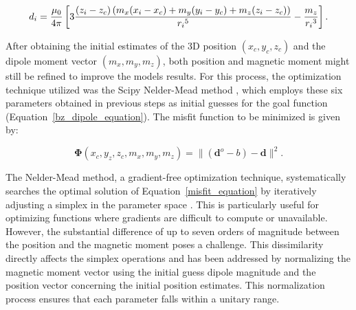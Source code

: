 
    \begin{equation}
        \small
        \label{bz_dipole_equation}
        {d}_{i} = \frac{\mu_0}{4 \pi} \left [ 3 \frac{ (z_i-z_c) \left ( m_x (x_i-x_c) + m_y (y_i-y_c) + m_z (z_i-z_c) \right )}{{r_i}^5} - \frac{m_z}{{r_i}^3} \right ] .
    \end{equation}
    
     After obtaining the initial estimates of the 3D position $(x_c, y_c, z_c)$ and the dipole moment vector $(m_x, m_y, m_z)$, both position and magnetic moment might still be refined to improve the models results. For this process, the optimization technique utilized was the Scipy Nelder-Mead method \citep{2020SciPy-NMeth}, which employs these six parameters obtained in previous steps as initial guesses for the goal function (Equation~\ref{bz_dipole_equation}). The misfit function to be minimized is given by:
    
    \begin{equation}
    \label{misfit_equation}
    \mathbf{\Phi} (x_c, y_z, z_c, m_x, m_y, m_z) = \| (\mathbf{d}^{o}-b) - \mathbf{d} \|^2.
    \end{equation} 
    
     The Nelder-Mead method, a gradient-free optimization technique, systematically searches the optimal solution of Equation~\ref{misfit_equation} by iteratively adjusting a simplex in the parameter space \citep{Nelder-Mead1965}. This is particularly useful for optimizing functions where gradients are difficult to compute or unavailable. However, the substantial difference of up to seven orders of magnitude between the position and the magnetic moment poses a challenge. This dissimilarity directly affects the simplex operations and has been addressed by normalizing the magnetic moment vector using the initial guess dipole magnitude and the position vector concerning the initial position estimates. This normalization process ensures that each parameter falls within a unitary range.
     

